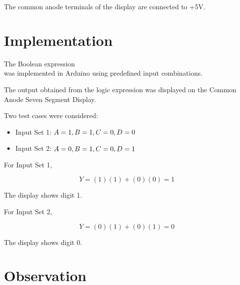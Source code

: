 \documentclass[12pt,a4paper]{article}
\begin{document}
The common anode terminals of the display are connected to +5V.

\section{Implementation}

The Boolean expression
\begin{equation}
[
Y=AB+CD
]
\end{equation}
was implemented in Arduino using predefined input combinations.

The output obtained from the logic expression was displayed on the Common Anode Seven Segment Display.

Two test cases were considered:

\begin{itemize}
\item Input Set 1: $A=1,\\ B=1,\\ C=0,\\ D=0$
\item Input Set 2: $A=0,\\ B=1,\\ C=0,\\ D=1$
\end{itemize}

For Input Set 1,

\begin{equation}
Y=(1)(1)+(0)(0)=1
\end{equation}

The display shows digit 1.

For Input Set 2,

\begin{equation}
Y=(0)(1)+(0)(1)=0
\end{equation}

The display shows digit 0.

\section{Observation}
\end{document}
